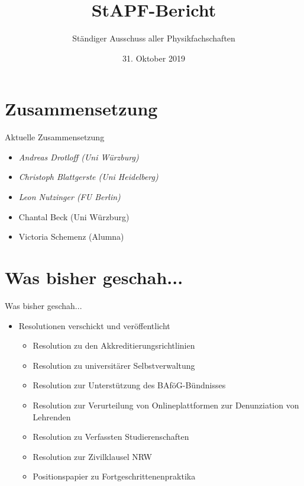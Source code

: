 \documentclass[compress, aspectratio=169]{beamer}
\title[StAPf-Bericht]{StAPF-Bericht}
\author{Ständiger Ausschuss aller Physikfachschaften}
\institute[Zusammenkunft aller Physikfachschaften]
\date{31. Oktober 2019}
\begin{document}
\begin{frame}[plain]{}
  \titlepage
\end{frame}

\section{Zusammensetzung}

\begin{frame}{Aktuelle Zusammensetzung}
  \begin{itemize}
  \item \emph{Andreas Drotloff (Uni Würzburg)}
  \item \emph{Christoph Blattgerste (Uni Heidelberg)}
  \item \emph{Leon Nutzinger (FU Berlin)}
  \item Chantal Beck (Uni Würzburg)
  \item Victoria Schemenz (Alumna)
  \end{itemize}
\end{frame}

\section{Was bisher geschah...}

\begin{frame}{Was bisher geschah...}
  \begin{itemize}
  \item Resolutionen verschickt und veröffentlicht
    \begin{itemize}
        \item Resolution zu den Akkreditierungsrichtlinien
        \item Resolution zu universitärer Selbstverwaltung
        \item Resolution zur Unterstützung des BAföG-Bündnisses
        \item Resolution zur Verurteilung von Onlineplattformen zur Denunziation von Lehrenden
        \item Resolution zu Verfassten Studierenschaften      
        \item Resolution zur Zivilklausel NRW
        \item Positionspapier zu Fortgeschrittenenpraktika
    \end{itemize}
  \end{itemize}
\end{frame}
\end{document}
